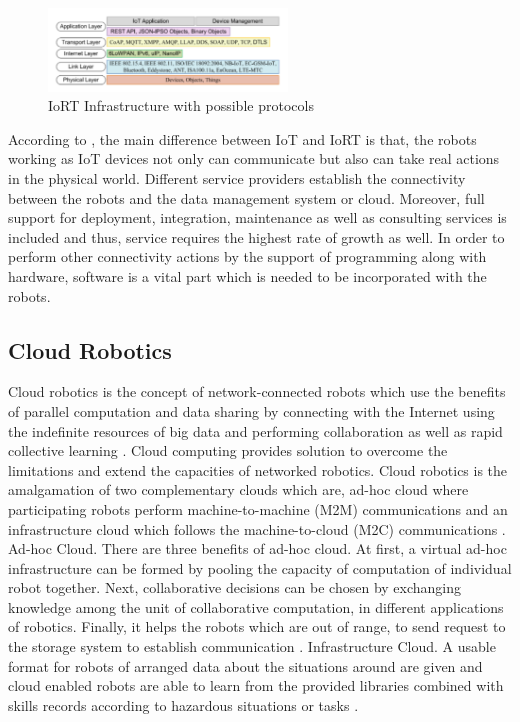\documentclass[conference]{IEEEtran}
\begin{document}
 \begin{figure}[ht!] %
 \centering
 \includegraphics[width=2.5in]{Picture2.png}
 \caption{IoRT Infrastructure with possible protocols \cite{nine}}
 \label{iort_possible_protocols}
 \end{figure}

According to \cite{ten}, the main difference between IoT and IoRT is that, the robots working as IoT devices not only can communicate but also can take real actions in the physical world. Different service providers establish the connectivity between the robots and the data management system or cloud. Moreover, full support for deployment, integration, maintenance as well as consulting services is included and thus, service requires the highest rate of growth as well. In order to perform other connectivity actions by the support of programming along with hardware, software is a vital part which is needed to be incorporated with the robots.



\subsection{Cloud Robotics}
Cloud robotics is the concept of network-connected robots which use the benefits of parallel computation and data sharing by connecting with the Internet using the indefinite resources of big data and performing collaboration as well as rapid collective learning \cite{eleven}. Cloud computing provides solution to overcome the limitations and extend the capacities of networked robotics. Cloud robotics is the amalgamation of two complementary clouds which are, ad-hoc cloud where participating robots perform machine-to-machine (M2M) communications and an infrastructure cloud which follows the machine-to-cloud (M2C) communications \cite{two}.
Ad-hoc Cloud. There are three benefits of ad-hoc cloud. At first, a virtual ad-hoc infrastructure can be formed by pooling the capacity of computation of individual robot together. Next, collaborative decisions can be chosen by exchanging knowledge among the unit of collaborative computation, in different applications of robotics. Finally, it helps the robots which are out of range, to send request to the storage system to establish communication \cite{two}.
Infrastructure Cloud. A usable format for robots of arranged data about the situations around are given and cloud enabled robots are able to learn from the provided libraries combined with skills records according to hazardous situations or tasks \cite{two}.
\end{document}

